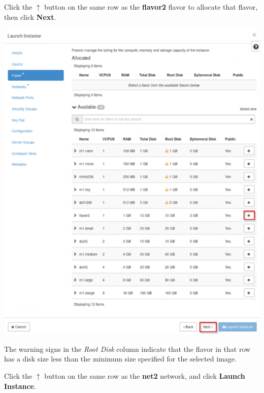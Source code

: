 \documentclass[letterpaper, 12pt]{article}
\begin{document}
\begin{enumerate}
    \begin{labstep}
        Click the $\uparrow$ button on the same row as the \textbf{flavor2} flavor to allocate that flavor, then click \textbf{Next}.
        \begin{center}
            \includegraphics[width=\linewidth]{images/part4/step5.png}
        \end{center}
    \end{labstep}

    \begin{notebox}
        The warning signs in the \textit{Root Disk} column indicate that the flavor in that row has a disk size less than the minimum size specified for the selected image.
    \end{notebox}

    \begin{labstep}
        Click the $\uparrow$ button on the same row as the \textbf{net2} network, and click \textbf{Launch Instance}.


\end{labstep}
\end{enumerate}
\end{document}
